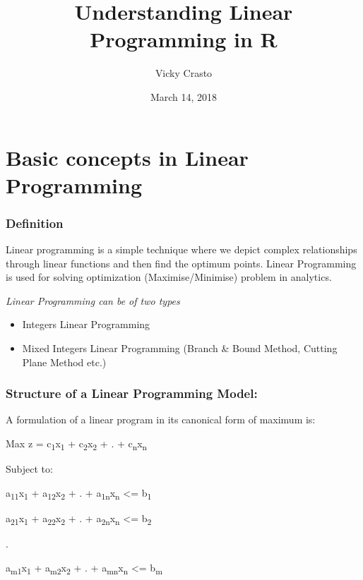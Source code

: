 \documentclass[]{article}
\title{Understanding Linear Programming in R}
\author{Vicky Crasto}
\date{March 14, 2018}
\providecommand{\tightlist}{%
  \setlength{\itemsep}{0pt}\setlength{\parskip}{0pt}}
\begin{document}
\maketitle

\section{Basic concepts in Linear
Programming}\label{basic-concepts-in-linear-programming}

\subsubsection{Definition}\label{definition}

Linear programming is a simple technique where we depict complex
relationships through linear functions and then find the optimum points.
Linear Programming is used for solving optimization (Maximise/Minimise)
problem in analytics.

\emph{Linear Programming can be of two types}

\begin{itemize}
\tightlist
\item
  Integers Linear Programming
\item
  Mixed Integers Linear Programming (Branch \& Bound Method, Cutting
  Plane Method etc.)
\end{itemize}

\subsubsection{Structure of a Linear Programming
Model:}\label{structure-of-a-linear-programming-model}

A formulation of a linear program in its canonical form of maximum is:

Max z = c\textsubscript{1}x\textsubscript{1} +
c\textsubscript{2}x\textsubscript{2} + . +
c\textsubscript{n}x\textsubscript{n}

Subject to:

a\textsubscript{11}x\textsubscript{1} +
a\textsubscript{12}x\textsubscript{2} + . +
a\textsubscript{1n}x\textsubscript{n} \textless{}= b\textsubscript{1}

a\textsubscript{21}x\textsubscript{1} +
a\textsubscript{22}x\textsubscript{2} + . +
a\textsubscript{2n}x\textsubscript{n} \textless{}= b\textsubscript{2}

.

a\textsubscript{m1}x\textsubscript{1} +
a\textsubscript{m2}x\textsubscript{2} + . +
a\textsubscript{mn}x\textsubscript{n} \textless{}= b\textsubscript{m}
\end{document}
